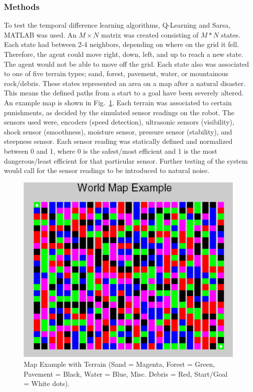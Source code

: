 \documentclass[12pt,american]{report}
\begin{document}
\subsubsection{Methods}

To test the temporal difference learning algorithms, Q-Learning and Sarsa, MATLAB was used. An $M\times N$ matrix was created consisting of $M*N$ states.  Each state had between 2-4 neighbors, depending on where on the grid it fell. Therefore, the agent could move right, down, left, and up to reach a new state. The agent would not be able to move off the grid. Each state also was associated to one of five terrain types; sand, forest, pavement, water, or mountainous rock/debris.  These states represented an area on a map after a natural disaster.  This means the defined paths from a start to a goal have been severely altered. An example map is shown in Fig.~\ref{fig:map-example}. Each terrain was associated to certain punishments, as decided by the simulated sensor readings on the robot.  The sensors used were, encoders (speed detection), ultrasonic sensors (visibility), shock sensor (smoothness), moisture sensor, pressure sensor (stability), and steepness sensor.  Each sensor reading was statically defined and normalized between 0 and 1, where 0 is the safest/most efficient and 1 is the most dangerous/least efficient for that particular sensor. Further testing of the system would call for the sensor readings to be introduced to natural noise.

\begin{figure}
\centering
\includegraphics[scale=1.5]{images/map-example.PNG}
\caption{Map Example with Terrain (Sand = Magenta, Forest = Green, Pavement = Black, Water = Blue, Misc. Debris = Red, Start/Goal = White dots).}
\label{fig:map-example}
\end{figure}
\end{document}

